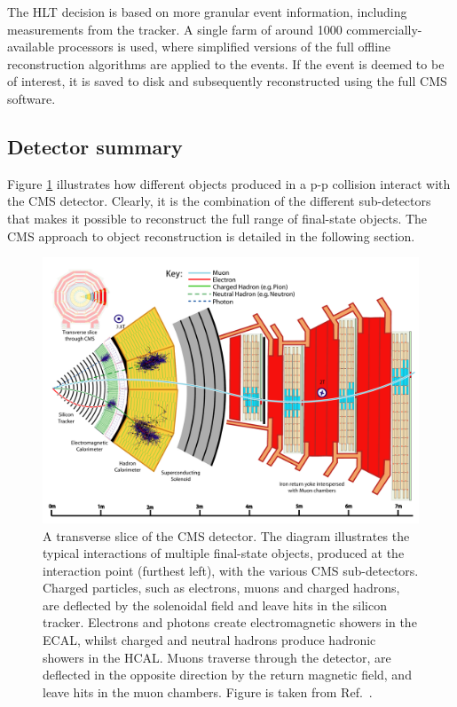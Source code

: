 The HLT decision is based on more granular event information, including measurements from the tracker. A single farm of around 1000 commercially-available processors is used, where simplified versions of the full offline reconstruction algorithms are applied to the events. If the event is deemed to be of interest, it is saved to disk and subsequently reconstructed using the full CMS software.

\subsection{Detector summary}
Figure \ref{fig:cms_interactions} illustrates how different objects produced in a p-p collision interact with the CMS detector. Clearly, it is the combination of the different sub-detectors that makes it possible to reconstruct the full range of final-state objects. The CMS approach to object reconstruction is detailed in the following section.

\begin{figure}[htb!]
  \centering
  \includegraphics[width=1\textwidth]{Figures/cms/CMS-PRF-14-001_Figure_001.pdf}
  \caption[Particle interactions in the CMS detector]
  {
    A transverse slice of the CMS detector. The diagram illustrates the typical interactions of multiple final-state objects, produced at the interaction point (furthest left), with the various CMS sub-detectors. Charged particles, such as electrons, muons and charged hadrons, are deflected by the solenoidal field and leave hits in the silicon tracker. Electrons and photons create electromagnetic showers in the ECAL, whilst charged and neutral hadrons produce hadronic showers in the HCAL. Muons traverse through the detector, are deflected in the opposite direction by the return magnetic field, and leave hits in the muon chambers. Figure is taken from Ref.~\cite{Sirunyan:2017ulk}.
  }
  \label{fig:cms_interactions}
\end{figure}

